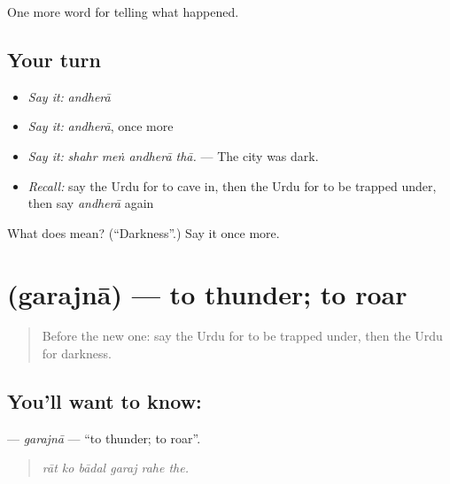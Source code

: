 \begin{grammarlens}[title={What you've built}]
One more word for telling what happened.
\end{grammarlens}

\subsection*{Your turn}
\begin{itemize}
\raggedright
  \item \emph{Say it:} \emph{andherā}
  \item \emph{Say it:} \emph{andherā}, once more
  \item \emph{Say it:} \emph{shahr meṅ andherā thā.} — The city was dark.
  \item \emph{Recall:} say the Urdu for to cave in, then the Urdu for to be trapped under, then say \emph{andherā} again
\end{itemize}

\begin{tcolorbox}[breakable,colback=teal!4,colframe=teal!35!black,title={Before you move on}]
What does  mean? (\textquotedblleft{}Darkness\textquotedblright{}.) Say it once more.
\end{tcolorbox}
\section[\texorpdfstring{\ur{گرجنا} (garajnā)}{گرجنا (garajnā)}]{ (garajnā) — to thunder; to roar}

\label{lesson:UR-C292-garajna}



\begin{quote}
Before the new one: say the Urdu for to be trapped under, then the Urdu for darkness.
\end{quote}

\subsection*{You'll want to know: }
\textbf{} — \emph{garajnā} — \textquotedblleft{}to thunder; to roar\textquotedblright{}.

\begin{quote}
     
\end{quote}

\begin{quote}
\emph{rāt ko bādal garaj rahe the.}
\end{quote}

